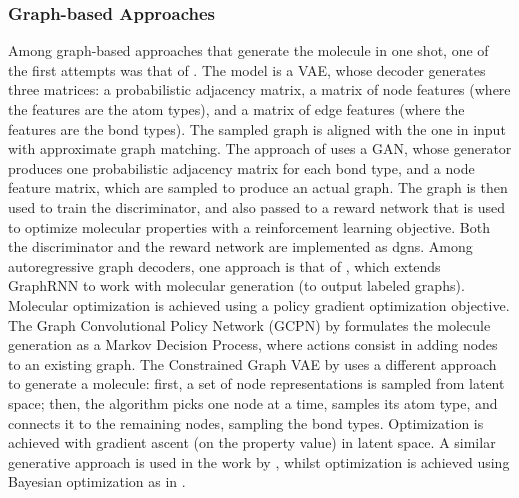 \subsubsection*{Graph-based Approaches}
Among graph-based approaches that generate the molecule in one shot, one of the first attempts was that of \citet{simonovsky2018graphvae}. The model is a VAE, whose decoder generates three matrices: a probabilistic adjacency matrix, a matrix of node features (where the features are the atom types), and a matrix of edge features (where the features are the bond types). The sampled graph is aligned with the one in input with approximate graph matching. The approach of \citet{decao2018molgan} uses a GAN, whose generator produces one probabilistic adjacency matrix for each bond type, and a node feature matrix, which are sampled to produce an actual graph. The graph is then used to train the discriminator, and also passed to a reward network that is used to optimize molecular properties with a reinforcement learning objective. Both the discriminator and the reward network are implemented as \glspl{dgn}. Among autoregressive graph decoders, one approach is that of \citet{popova2019molecularrnn}, which extends GraphRNN \citep{you2018graphrnn} to work with molecular generation (\ie to output labeled graphs). Molecular optimization is achieved using a policy gradient optimization objective. The Graph Convolutional Policy Network (GCPN) by \citet{you2018graphconvpolicynetwork} formulates the molecule generation as a Markov Decision Process, where actions consist in adding nodes to an existing graph. The Constrained Graph VAE by \citet{liu2018cgvae} uses a different approach to generate a molecule: first, a set of node representations is sampled from latent space; then, the algorithm picks one node at a time, samples its atom type, and connects it to the remaining nodes, sampling the bond types. Optimization is achieved with gradient ascent (on the property value) in latent space. A similar generative approach is used in the work by \citet{samanta2019nevae}, whilst optimization is achieved using Bayesian optimization as in \citet{gomez2018vaemolecule}.

